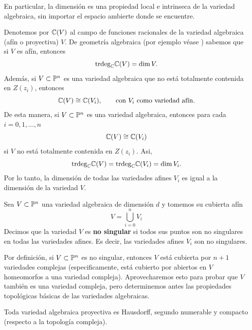 En particular, la dimensión es una propiedad local e intrinseca de la variedad  algebraica, sin importar el espacio ambierte donde se encuentre.

\begin{remark}\label{dimcubierta}
	Denotemos por $\mathbb{C}(V)$ al campo de funciones racionales de la variedad algebraica (afín o proyectiva) $V$. De geometría algebraica (por ejemplo véase \parencite[Cap. 1 Sec. 3]{Harts}) sabemos que si $V$ es afín, entonces
	\begin{equation*}
		\mathrm{trdeg}_{\mathbb{C}} \mathbb{C}(V)=\dim V.
	\end{equation*}
	Además, si $V\subset \mathbb{P}^n$ es una variedad algebraica que no está totalmente contenida en $Z(z_i)$, entonces 
	\begin{equation*}
		\mathbb{C}(V)\cong \mathbb{C}(V_i),\qquad \text{con }V_i\text{ como variedad afín}.
	\end{equation*}
	De esta manera, si $V\subset\mathbb{P}^n$ es una variedad algebraica, entonces para cada $i=0,1,\dots, n$ 
	\begin{equation*}
		\mathbb{C}(V)\cong \mathbb{C}(V_i)
	\end{equation*}
	si $V$ no está totalmente contenida en $Z(z_i)$. Asi,
	\begin{equation*}
		\mathrm{trdeg}_{\mathbb{C}}\mathbb{C}(V)=\mathrm{trdeg}_{\mathbb{C}}\mathbb{C}(V_i)=\dim V_i.
	\end{equation*}
	Por lo tanto, la dimensión de todas las variedades afines $V_i$ es igual a la dimensión de la variedad $V$.
\end{remark}

\begin{definition}
	Sea $V\subset\mathbb{P}^n$ una variedad algebraica de dimensión $d$ y tomemos su cubierta afín
	\begin{equation*}
		V=\bigcup_{i=0}^n V_i
	\end{equation*}
	Decimos que la variedad $V$ es \textbf{no singular} si todos sus puntos son no singulares en todas las variedades afines. Es decir, las variedades afines $V_i$ son no singulares.
\end{definition}

Por definición, si $V\subset\mathbb{P}^n$ es no singular, entonces $V$ está cubierta por $n+1$ variedades complejas (especificamente, está cubierto por abiertos en $V$ homeomorfos a una variedad compleja). Aprovecharemos esto para probar que $V$ también es una variedad compleja, pero determinemos antes las propiedades topológicas básicas de las variedades algebraicas.

\begin{lemma}\label{topovariedades}
	Toda variedad algebraica proyectiva es Hausdorff, segundo numerable y compacto (respecto a la topología compleja).
\end{lemma}

